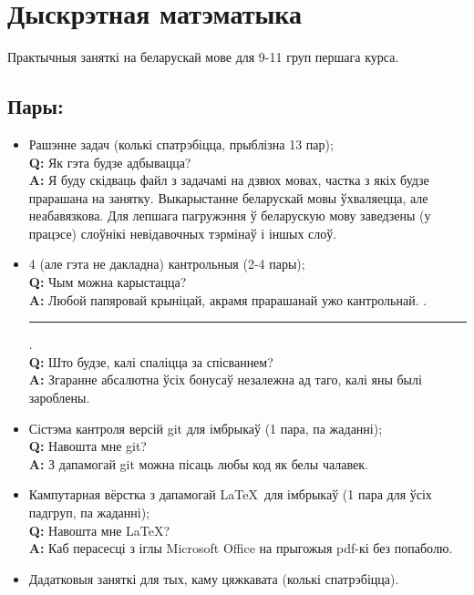 \documentclass[12pt, a4paper]{extarticle}
\newcommand{\formQA}[2]{%
	\textbf{Q:} #1 \\
	\textbf{A:} #2
}
\begin{document}
	\section{Дыскрэтная матэматыка}
	Практычныя заняткі на беларускай мове для 9-11 груп першага курса. 	\subsection{Пары:}
	\begin{itemize}
		\item Рашэнне задач (колькі спатрэбіцца, прыблізна 13 пар); \\[6pt]
		\formQA{Як гэта будзе адбывацца?}
		{Я буду скідваць файл з задачамі на дзвюх мовах, частка з якіх будзе прарашана на занятку. Выкарыстанне беларускай мовы ўхваляецца, але неабавязкова. Для лепшага пагружэння ў беларускую мову заведзены (у працэсе) слоўнікі невідавочных тэрмінаў і іншых слоў.}
		\item 4 (але гэта не дакладна) кантрольныя (2-4 пары); \\[6pt]
		\formQA{Чым можна карыстацца?}
		{Любой папяровай крыніцай, акрамя прарашанай ужо кантрольнай. .\noindent\rule{0.5cm}{0.4pt}. \\[6pt]}
		\formQA{Што будзе, калі спаліцца за спісваннем?}
		{Згаранне абсалютна ўсіх бонусаў незалежна ад таго, калі яны былі зароблены.}
		\item Сістэма кантроля версій git для імбрыкаў (1 пара, па жаданні); \\[6pt]
		\formQA{Навошта мне git?}
		{З дапамогай git можна пісаць любы код як белы чалавек.}
		\item Кампутарная вёрстка з дапамогай \LaTeX~для імбрыкаў (1 пара для ўсіх падгруп, па жаданні); \\[6pt]
		\formQA{Навошта мне \LaTeX?}
		{Каб перасесці з іглы Microsoft Office на прыгожыя pdf-кі без попаболю.}
		\item Дадатковыя заняткі для тых, каму цяжкавата (колькі спатрэбіцца).
	\end{itemize}
\end{document}
